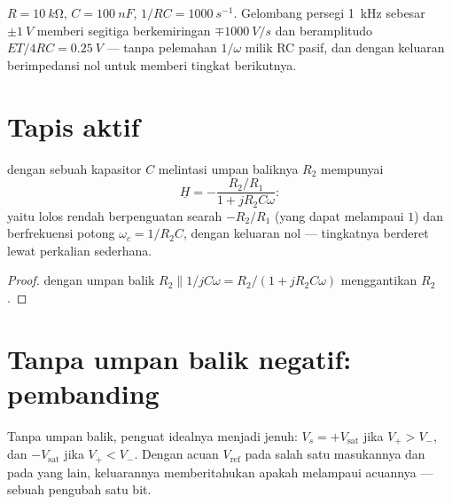 \begin{example}\label{ex:b1:operational-amplifier:triangle}
$R = \qty{10}{k\ohm}$, $C = \qty{100}{nF}$, $1/RC = \qty{1000}{s^{-1}}$.
Gelombang persegi \qty{1}{kHz} sebesar $\pm\qty{1}{V}$ memberi segitiga
berkemiringan $\mp\qty{1000}{V/s}$ dan beramplitudo
$ET/4RC = \qty{0.25}{V}$ --- tanpa pelemahan $1/\omega$ milik RC pasif,
dan dengan keluaran berimpedansi nol untuk memberi tingkat berikutnya.
\end{example}

\section{Tapis aktif}

\begin{proposition}\label{prop:b1:operational-amplifier:activelp}
 dengan sebuah kapasitor $C$ melintasi  umpan
baliknya $R_2$ mempunyai
\[
\underline H = -\frac{R_2/R_1}{1 + jR_2C\omega}:
\]
yaitu lolos rendah berpenguatan searah $-R_2/R_1$ (yang dapat melampaui
$1$) dan berfrekuensi potong $\omega_c = 1/R_2C$, dengan 
keluaran nol --- tingkatnya berderet lewat perkalian sederhana.
\end{proposition}

\begin{proof}
 dengan  umpan balik $R_2 \parallel 1/jC\omega
= R_2/(1 + jR_2C\omega)$ menggantikan $R_2$.
\end{proof}

\section{Tanpa umpan balik negatif: pembanding}

\begin{proposition}[Pembanding]\label{prop:b1:operational-amplifier:comparator}
Tanpa umpan balik, penguat idealnya menjadi jenuh:
$V_s = +V_{\mathrm{sat}}$ jika $V_+ > V_-$, dan $-V_{\mathrm{sat}}$ jika
$V_+ < V_-$. Dengan acuan $V_{\mathrm{ref}}$ pada salah satu masukannya
dan  pada yang lain, keluarannya memberitahukan apakah 
melampaui acuannya --- sebuah pengubah satu bit.
\end{proposition}

